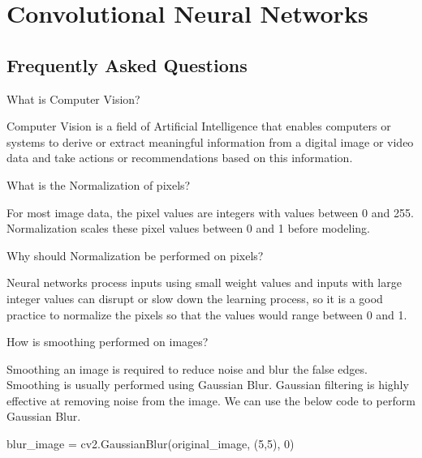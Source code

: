 	\chapter{Convolutional Neural Networks}
	\section{Frequently Asked Questions}

	\resetquestioncounter{}
	\begin{qanda}
		\begin{question}
 What is Computer Vision?
		\end{question}
		\begin{answer}
Computer Vision is a field of Artificial Intelligence that enables computers or systems to derive or extract meaningful information from a digital image or video data and take actions or recommendations based on this information.
		\end{answer}
	\end{qanda}

	\begin{qanda}
		\begin{question}
 What is the Normalization of pixels?
		\end{question}
		\begin{answer}
For most image data, the pixel values are integers with values between 0 and 255. Normalization scales these pixel values between 0 and 1 before modeling.
		\end{answer}
	\end{qanda}

	\begin{qanda}
		\begin{question}
Why should Normalization be performed on pixels?
		\end{question}
		\begin{answer}
Neural networks process inputs using small weight values and inputs with large integer values can disrupt or slow down the learning process, so it is a good practice to normalize the pixels so that the values would range between 0 and 1.
		\end{answer}
	\end{qanda}

	\begin{qanda}
		\begin{question}
How is smoothing performed on images?
		\end{question}
		\begin{answer}
Smoothing an image is required to reduce noise and blur the false edges. Smoothing is usually performed using Gaussian Blur. Gaussian filtering is highly effective at removing noise from the image. We can use the below code to perform Gaussian Blur.

		\begin{code}[\codenumbering]{}
			\codeitemnonumber blur\_image = cv2.GaussianBlur(original\_image, (5,5), 0)
		\end{code}
		\end{answer}
	\end{qanda}

